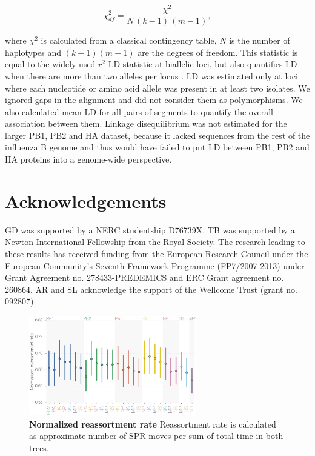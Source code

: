 \documentclass[11pt,oneside,letterpaper]{article}
\newcommand{\chiSq}{\chi^{2}_{df}}
\begin{document}
\begin{equation}
\chiSq=\frac{\chi^{2}}{N\,(k-1)\,(m-1)},
\end{equation}

where $\chi^{2}$ is calculated from a classical contingency table, $N$ is the number of haplotypes and $(k-1)(m-1)$ are the degrees of freedom.
This statistic is equal to the widely used $r^2$ LD statistic at biallelic loci, but also quantifies LD when there are more than two alleles per locus \cite{zhao2005}.
LD was estimated only at loci where each nucleotide or amino acid allele was present in at least two isolates.
We ignored gaps in the alignment and did not consider them as polymorphisms.
We also calculated mean LD for all pairs of segments to quantify the overall association between them.
Linkage disequilibrium was not estimated for the larger PB1, PB2 and HA dataset, because it lacked sequences from the rest of the influenza B genome and thus would have failed to put LD between PB1, PB2 and HA proteins into a genome-wide perspective.

\section*{Acknowledgements}
GD was supported by a NERC studentship D76739X.
TB was supported by a Newton International Fellowship from the Royal Society. 
The research leading to these results has received funding from the European Research Council under the European Community's Seventh Framework Programme (FP7/2007-2013) under Grant Agreement no. 278433-PREDEMICS and ERC Grant agreement no. 260864.
AR and SL acknowledge the support of the Wellcome Trust (grant no. 092807).




\clearpage

\setcounter{figure}{0}
\setcounter{table}{0}
\renewcommand{\thefigure}{S\arabic{figure}}
\renewcommand{\thetable}{S\arabic{table}}

\begin{figure}
\centering  
\includegraphics[width=0.65\textwidth]  {supp_figures/InfB_supp_normRErate.png}
\caption{\textbf{Normalized reassortment rate}
Reassortment rate is calculated as approximate number of SPR moves per sum of total time in both trees.}
\label{NormSPR_RErate}
\end{figure}
\end{document}
